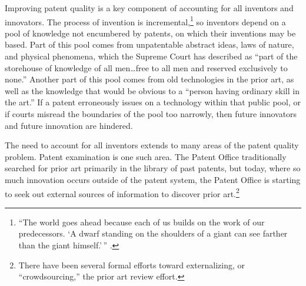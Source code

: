 \documentclass[11pt,twocolumn,titlepage]{article}
\begin{document}
Improving patent quality is a key component of accounting for all inventors and
innovators. The process of invention is incremental,\footnote{``The world goes
ahead because each of us builds on the work of our predecessors. `A dwarf
standing on the shoulders of a giant can see farther than the giant
himself.'\,'' .} so inventors depend on a pool of knowledge
not encumbered by patents, on which their inventions may be based. Part of this
pool comes from unpatentable abstract ideas, laws of nature, and physical
phenomena, which the Supreme Court has described as ``part of the storehouse of
knowledge of all men\ldots free to all men and reserved exclusively to
none.'' Another part of this pool comes from old technologies in the prior
art, as well as the knowledge that would be obvious to
a
``person having ordinary skill in the art.'' If a
patent erroneously issues on a technology within that public pool, or if courts
misread the boundaries of the pool too narrowly, then future innovators and
future innovation are hindered.

The need to account for all inventors extends to many
areas of the patent quality problem. Patent examination is one such area. The
Patent Office traditionally searched for prior art primarily in the library of
past patents, but today, where so much
innovation occurs outside of the patent system, the Patent Office is starting to
seek out external sources of information to discover prior art.\footnote{There
have been several formal efforts toward externalizing, or ``crowdsourcing,'' the
prior art review effort. }
\end{document}
